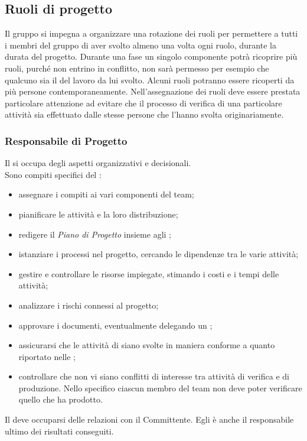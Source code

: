\subsection{Ruoli di progetto}

Il gruppo \GroupName{} si impegna a organizzare una rotazione dei ruoli per permettere a tutti i membri del gruppo di aver svolto almeno una volta ogni ruolo, durante la durata del progetto. Durante una fase un singolo componente potrà ricoprire più ruoli, purché non entrino in conflitto, non sarà permesso per esempio che qualcuno sia il \Verificatore{} del lavoro da lui svolto. Alcuni ruoli potranno essere ricoperti da più persone contemporaneamente.
Nell'assegnazione dei ruoli deve essere prestata particolare attenzione ad evitare che il processo di verifica di una particolare attività sia effettuato dalle stesse persone che l'hanno svolta originariamente.


\subsubsection{Responsabile di Progetto} \label{sec:responsabile}
Il \Responsabile{} si occupa degli aspetti organizzativi e decisionali.\\
Sono compiti specifici del \Responsabile:
\begin{itemize}
	\item assegnare i compiti ai vari componenti del team;
	\item pianificare le attività e la loro distribuzione;
	\item redigere il \textit{Piano di Progetto} insieme agli \Amministratori;
	\item istanziare i processi nel progetto, cercando le dipendenze tra le varie attività;
	\item gestire e controllare le risorse impiegate, stimando i costi e i tempi delle attività;
	\item analizzare i rischi connessi al progetto;
	\item approvare i documenti, eventualmente delegando un \Verificatore;
	\item assicurarsi che le attività di \VV{} siano svolte in maniera conforme a quanto riportato nelle \NormeDiProgetto;
	\item controllare che non vi siano conflitti di interesse tra attività di verifica e di produzione. Nello specifico ciascun membro del team non deve poter verificare quello che ha prodotto.
\end{itemize}
Il \Responsabile{} deve occuparsi delle relazioni con il Committente.
Egli è anche il responsabile ultimo dei risultati conseguiti.


